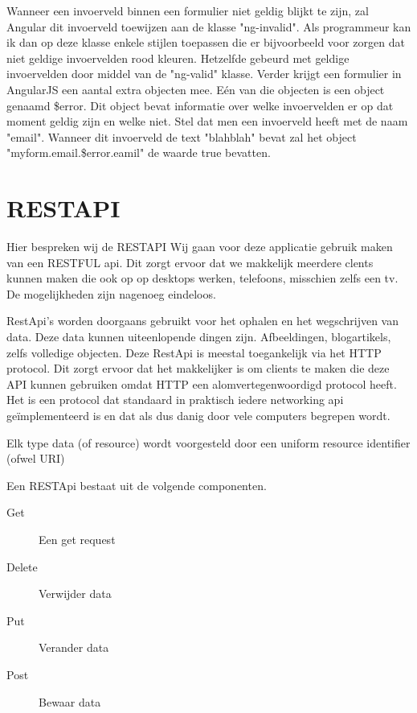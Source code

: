 \documentclass[a4paper,11pt]{article}
\begin{document}
Wanneer een invoerveld binnen een formulier niet geldig blijkt te zijn, zal Angular dit invoerveld toewijzen aan de klasse "ng-invalid". Als programmeur kan ik dan op deze klasse enkele stijlen toepassen die er bijvoorbeeld voor zorgen dat niet geldige invoervelden rood kleuren. Hetzelfde gebeurd met geldige invoervelden door middel van de "ng-valid" klasse. Verder krijgt een formulier in AngularJS een aantal extra objecten mee. Eén van die objecten is een object genaamd \$error. Dit object bevat informatie over welke invoervelden er op dat moment geldig zijn en welke niet. Stel dat men een invoerveld heeft met de naam "email". Wanneer dit invoerveld de text "blahblah" bevat zal het object "myform.email.\$error.eamil" de waarde true bevatten.


\section{RESTAPI} %
Hier bespreken wij de RESTAPI
Wij gaan voor deze applicatie gebruik maken van een RESTFUL api. Dit zorgt
ervoor dat we makkelijk meerdere clents kunnen maken die ook op op desktops
werken, telefoons, misschien zelfs een tv. De mogelijkheden zijn nagenoeg
eindeloos.

RestApi's worden doorgaans gebruikt voor het ophalen en het wegschrijven van
data. Deze data kunnen uiteenlopende dingen zijn. Afbeeldingen, blogartikels,
zelfs volledige objecten. Deze RestApi is meestal toegankelijk via het HTTP
protocol. Dit zorgt ervoor dat het makkelijker is om clients te maken die deze
API kunnen gebruiken omdat HTTP een alomvertegenwoordigd protocol heeft. Het is
een protocol dat standaard in praktisch iedere networking api geïmplementeerd is
en dat als dus danig door vele computers begrepen wordt.

Elk type data (of resource) wordt voorgesteld door een uniform resource
identifier (ofwel URI)

Een RESTApi bestaat uit de volgende componenten.
\begin{description}
  \item [Get] Een get request
  \item [Delete] Verwijder data
  \item [Put] Verander data
  \item [Post] Bewaar data
\end{description}
\end{document}
